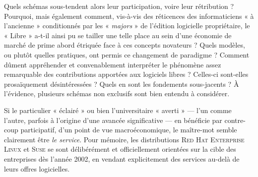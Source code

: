 Quels schémas sous-tendent alors leur participation, voire leur rétribution ? Pourquoi, mais également comment, vis-à-vis des réticences des informaticiens « à l'ancienne » conditionnés par les « \textit{majors} » de l'édition logicielle propriétaire, le « Libre » a-t-il ainsi pu se tailler une telle place au sein d'une économie de marché de prime abord étriquée face à ces concepts novateurs ? Quels modèles, ou plutôt quelles pratiques, ont permis ce changement de paradigme ?
Comment dûment appréhender et convenablement interpréter le phénomène assez remarquable des con\-tributions apportées aux logiciels libres ? Celles-ci sont-elles prosaïquement désintéressées ? Quels en sont les fondements sous-jacents ? À l'évidence, plusieurs schémas non exclusifs sont bien entendu à considérer.

Si le particulier « éclairé » ou bien l'universitaire « averti » --- l'un comme l'autre, parfois à l'origine d'une avancée significative --- en bénéficie par contre-coup participatif, d'un point de vue macroéconomique, le maître-mot semble clairement être \textit{le service}. Pour mémoire, les distributions \textsc{Red Hat Enterprise Linux} et \textsc{Suse} se sont délibérément et officiellement orientées sur la cible des entreprises dès l'année 2002, en vendant explicitement des services au-delà de leurs offres logicielles.

